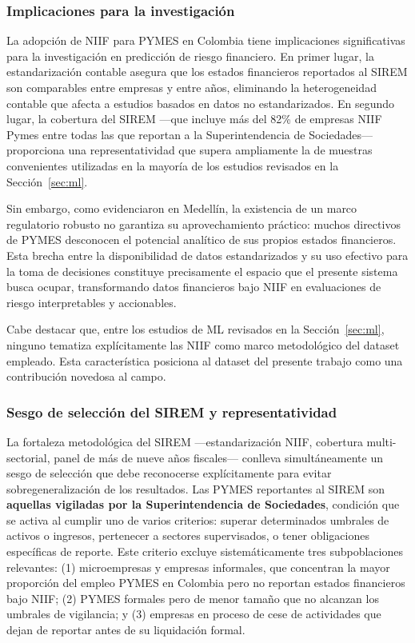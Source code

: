 \documentclass[12pt, letterpaper]{article}
\begin{document}
\subsubsection{Implicaciones para la investigaci\'on}

La adopci\'on de NIIF para PYMES en Colombia tiene implicaciones significativas para la investigaci\'on en predicci\'on de riesgo financiero. En primer lugar, la estandarizaci\'on contable asegura que los estados financieros reportados al SIREM son comparables entre empresas y entre a\~nos, eliminando la heterogeneidad contable que afecta a estudios basados en datos no estandarizados. En segundo lugar, la cobertura del SIREM ---que incluye m\'as del 82\% de empresas NIIF Pymes entre todas las que reportan a la Superintendencia de Sociedades--- proporciona una representatividad que supera ampliamente la de muestras convenientes utilizadas en la mayor\'ia de los estudios revisados en la Secci\'on~\ref{sec:ml}.

Sin embargo, como evidenciaron \citet{CardonaZuleta2025} en Medell\'in, la existencia de un marco regulatorio robusto no garantiza su aprovechamiento pr\'actico: muchos directivos de PYMES desconocen el potencial anal\'itico de sus propios estados financieros. Esta brecha entre la disponibilidad de datos estandarizados y su uso efectivo para la toma de decisiones constituye precisamente el espacio que el presente sistema busca ocupar, transformando datos financieros bajo NIIF en evaluaciones de riesgo interpretables y accionables.

Cabe destacar que, entre los estudios de ML revisados en la Secci\'on~\ref{sec:ml}, ninguno tematiza expl\'icitamente las NIIF como marco metodol\'ogico del dataset empleado. Esta caracter\'istica posiciona al dataset del presente trabajo como una contribuci\'on novedosa al campo.

\subsubsection{Sesgo de selecci\'on del SIREM y representatividad}
\label{sec:sirem-sesgo}

La fortaleza metodol\'ogica del SIREM ---estandarizaci\'on NIIF, cobertura multi-sectorial, panel de m\'as de nueve a\~nos fiscales--- conlleva simult\'aneamente un sesgo de selecci\'on que debe reconocerse expl\'icitamente para evitar sobregeneralizaci\'on de los resultados. Las PYMES reportantes al SIREM son \textbf{aquellas vigiladas por la Superintendencia de Sociedades}, condici\'on que se activa al cumplir uno de varios criterios: superar determinados umbrales de activos o ingresos, pertenecer a sectores supervisados, o tener obligaciones espec\'ificas de reporte. Este criterio excluye sistem\'aticamente tres subpoblaciones relevantes: (1) microempresas y empresas informales, que concentran la mayor proporci\'on del empleo PYMES en Colombia pero no reportan estados financieros bajo NIIF; (2) PYMES formales pero de menor tama\~no que no alcanzan los umbrales de vigilancia; y (3) empresas en proceso de cese de actividades que dejan de reportar antes de su liquidaci\'on formal.
\end{document}
